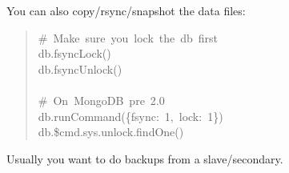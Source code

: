 \documentclass[letter]{article}
\begin{document}
You can also copy/rsync/snapshot the data files:
%
\begin{quote}{\ttfamily \raggedright \noindent
\#~Make~sure~you~lock~the~db~first\\
db.fsyncLock()\\
db.fsyncUnlock()\\
~\\
\#~On~MongoDB~pre~2.0\\
db.runCommand(\{fsync:~1,~lock:~1\})\\
db.\$cmd.sys.unlock.findOne()
}
\end{quote}

Usually you want to do backups from a slave/secondary.
\end{document}
